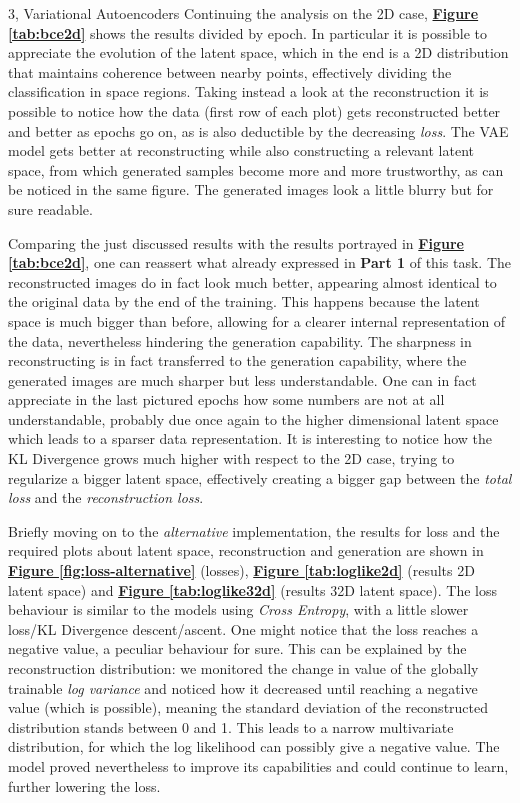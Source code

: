 \documentclass[10pt,a4paper]{article}
\begin{document}
\begin{task}{3, Variational Autoencoders}
Continuing the analysis on the 2D case, \textbf{\hyperref[tab:bce2d]{Figure \ref{tab:bce2d}}} shows the results divided by epoch. In particular it is possible to appreciate the evolution of the latent space, which in the end is a 2D distribution that maintains coherence between nearby points, effectively dividing the classification in space regions. Taking instead a look at the reconstruction it is possible to notice how the data (first row of each plot) gets reconstructed better and better as epochs go on, as is also deductible by the decreasing \textit{loss}. The VAE model gets better at reconstructing while also constructing a relevant latent space, from which generated samples become more and more trustworthy, as can be noticed in the same figure. The generated images look a little blurry but for sure readable.

Comparing the just discussed results with the results portrayed in \textbf{\hyperref[tab:bce32d]{Figure \ref{tab:bce2d}}}, one can reassert what already expressed in \textbf{Part 1} of this task. The reconstructed images do in fact look much better, appearing almost identical to the original data by the end of the training. This happens because the latent space is much bigger than before, allowing for a clearer internal representation of the data, nevertheless hindering the generation capability. The sharpness in reconstructing is in fact transferred to the generation capability, where the generated images are much sharper but less understandable. One can in fact appreciate in the last pictured epochs how some numbers are not at all understandable, probably due once again to the higher dimensional latent space which leads to a sparser data representation. It is interesting to notice how the KL Divergence grows much higher with respect to the 2D case, trying to regularize a bigger latent space, effectively creating a bigger gap between the \textit{total loss} and the \textit{reconstruction loss}.

Briefly moving on to the \textit{alternative} implementation, the results for loss and the required plots about latent space, reconstruction and generation are shown in \textbf{\hyperref[fig:loss-alternative]{Figure \ref{fig:loss-alternative}}} (losses), \textbf{\hyperref[loglike2d]{Figure \ref{tab:loglike2d}}} (results 2D latent space) and  \textbf{\hyperref[tab:loglike32d]{Figure \ref{tab:loglike32d}}} (results 32D latent space). The loss behaviour is similar to the models using \textit{Cross Entropy}, with a little slower loss/KL Divergence descent/ascent. One might notice that the loss reaches a negative value, a peculiar behaviour for sure. This can be explained by the reconstruction distribution: we monitored the change in value of the globally trainable \textit{log variance} and noticed how it decreased until reaching a negative value (which is possible), meaning the standard deviation of the reconstructed distribution stands between 0 and 1. This leads to a narrow multivariate distribution, for which the log likelihood can possibly give a negative value. The model proved nevertheless to improve its capabilities and could continue to learn, further lowering the loss.


\end{task}
\end{document}
